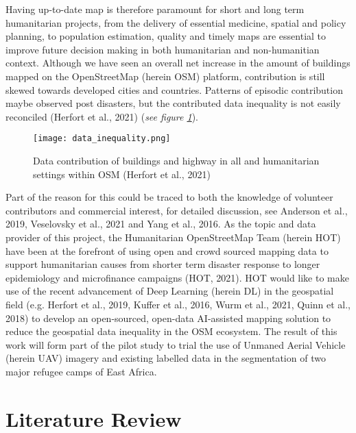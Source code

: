 \documentclass[11pt, a4paper, twoside]{report}
\begin{document}
Having up-to-date map is therefore paramount for short and long term humanitarian projects, from the delivery of essential medicine, spatial and policy planning, to population estimation, quality and timely maps are essential to improve future decision making in both humanitarian and non-humanitian context. Although we have seen an overall net increase in the amount of buildings mapped on the OpenStreetMap (herein OSM) platform, contribution is still skewed towards developed cities and countries. Patterns of episodic contribution maybe observed post disasters, but the contributed data inequality is not easily reconciled (Herfort et al., 2021) (\textit{see figure \ref{fig:data_inequality}}).\\\par

\begin{figure}[H]
  \centering
  \texttt{[image: data\_inequality.png]}
  \caption{Data contribution of buildings and highway in all and humanitarian settings within OSM (Herfort et al., 2021)}
  \label{fig:data_inequality}
\end{figure}

Part of the reason for this could be traced to both the knowledge of volunteer contributors and commercial interest, for detailed discussion, see Anderson et al., 2019, Veselovsky et al., 2021 and Yang et al., 2016. As the topic and data provider of this project, the Humanitarian OpenStreetMap Team (herein HOT) have been at the forefront of using open and crowd sourced mapping data to support humanitarian causes from shorter term disaster response to longer epidemiology and microfinance campaigns (HOT, 2021). HOT would like to make use of the recent advancement of Deep Learning (herein DL) in the geospatial field (e.g. Herfort et al., 2019, Kuffer et al., 2016, Wurm et al., 2021, Quinn et al., 2018) to develop an open-sourced, open-data AI-assisted mapping solution to reduce the geospatial data inequality in the OSM ecosystem. The result of this work will form part of the pilot study to trial the use of Unmaned Aerial Vehicle (herein UAV) imagery and existing labelled data in the segmentation of two major refugee camps of East Africa.\\\par

\newpage

\chapter{Literature Review}\label{LitReview}
\end{document}
